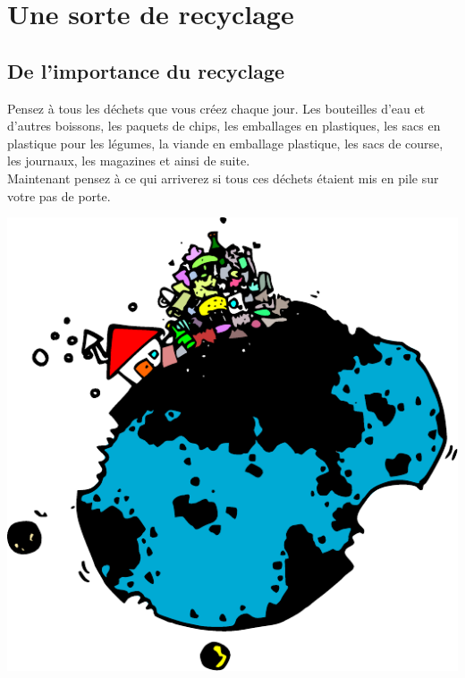 



\chapter{Une sorte de recyclage}\label{chap:recyclage}
\section{De l'importance du recyclage}
Pensez à tous les déchets que vous créez chaque jour. Les bouteilles d'eau et d'autres boissons, les paquets de chips, les emballages en plastiques, les sacs en plastique pour les légumes, la viande en emballage plastique, les sacs de course, les journaux, les magazines et ainsi de suite.\\

Maintenant pensez à ce qui arriverez si tous ces déchets étaient mis en pile sur votre pas de porte.

\begin{center}
 \includegraphics{images/recycler.pdf}
\end{center}

